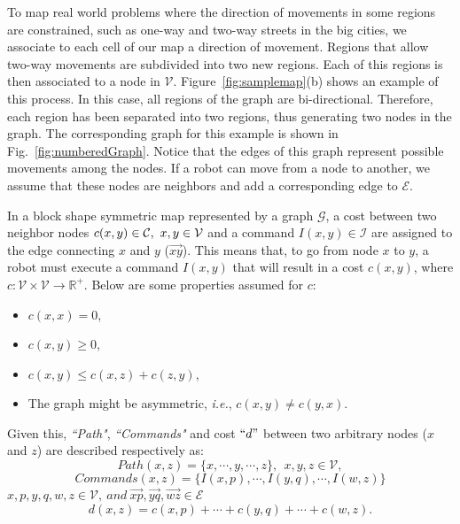 \documentclass[smallcondensed]{svjour3}
\begin{document}
To map real world problems where the direction of movements in some regions are constrained, such as one-way and two-way streets in the big cities, we associate to each cell of our map a direction of movement. Regions that allow two-way movements are subdivided into two new regions. Each of this regions is then associated to a node in $\mathcal{V}$. Figure~\ref{fig:samplemap}(b) shows an example of this process. In this case, all regions of the graph are bi-directional. Therefore, each region has been separated into two regions, thus generating two nodes in the graph. The corresponding graph for this example is shown in Fig.~\ref{fig:numberedGraph}. Notice that the edges of this graph represent possible movements among the nodes. If a robot can move from a node to another, we assume that these nodes are neighbors and add a corresponding edge to $\mathcal{E}$.

In a block shape symmetric map represented by a graph $\mathcal{G}$, a cost between two neighbor nodes $\sloppy c(x,y)\in \mathcal{C},~ x,y \in \mathcal{V}$ and a command $I(x,y) \in \mathcal{I}$ are assigned to the edge connecting $x$ and $y$ ($\overrightarrow{xy}$). This means that, to go from node $x$ to $y$, a robot must execute a command $I(x,y)$ that will result in a cost $c(x,y)$,
%
where $c:\mathcal{V} \times \mathcal{V} \rightarrow\mathbb{R}^+$. 
Below are some properties assumed for $c$:
%
\begin{itemize}
\item $c(x,x)=0$,
\item $c(x,y)\geq0$, 
\item $c(x,y)\leq c(x,z)+c(z,y)$,
\item The  graph might be asymmetric, \emph{i.e.}, $c(x,y)\neq c(y,x)$.
\end{itemize}
%

Given this, \textit{``Path"}, \textit{``Commands"} and cost $``d"$ between two arbitrary nodes ($x$ and $z$) are described respectively as:%
\[Path(x,z)=\{x,\cdots,y,\cdots,z\}, ~~x,y,z \in \mathcal V,\]
%
\[Commands(x,z)= \{I(x,p),\cdots,I(y,q),\cdots,I(w,z)\}\]
$x,p,y,q,w,z \in \mathcal V, ~and~ \overrightarrow{xp}, \overrightarrow{yq}, \overrightarrow{wz} \in \mathcal{E}$
%
\[d(x,z)=c(x,p)+\cdots+c(y,q)+\cdots+c(w,z).\]
\end{document}
